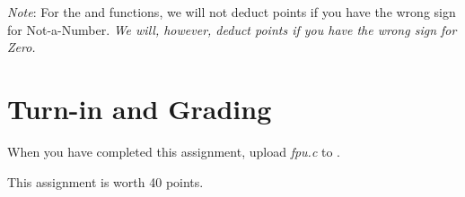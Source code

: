     \textit{Note}: For the  and  functions, we will not deduct points if you have the wrong sign for Not-a-Number.
    \textit{We will, however, deduct points if you have the wrong sign for Zero.}


    \section*{Turn-in and Grading}

    When you have completed this assignment, upload \textit{fpu.c} to
    \filesubmission.

    This assignment is worth 40 points. \\

